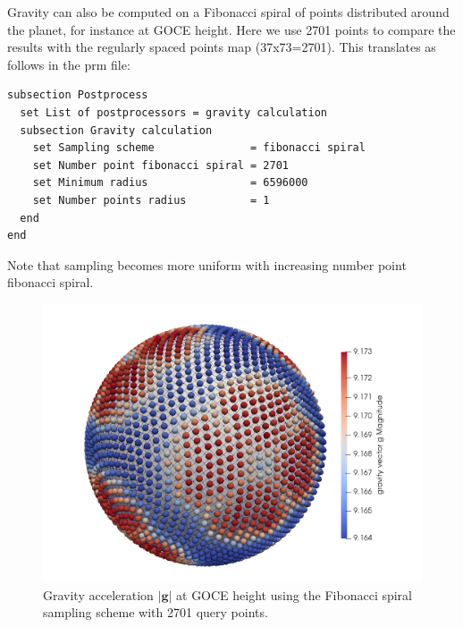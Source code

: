 Gravity can also be computed on a Fibonacci spiral of points distributed around the planet, for instance at GOCE height. Here we use 2701 points to compare the results with the regularly spaced points map (37x73=2701). This translates as follows in the prm file:

\begin{lstlisting}
subsection Postprocess
  set List of postprocessors = gravity calculation
  subsection Gravity calculation
    set Sampling scheme               = fibonacci spiral
    set Number point fibonacci spiral = 2701
    set Minimum radius                = 6596000 
    set Number points radius          = 1
  end
end
\end{lstlisting}

Note that sampling becomes more uniform with increasing number point fibonacci spiral.

\begin{figure}[h!]
\centering
\includegraphics[scale=.4]{../../benchmarks/gravity_prem/doc/spiral_prem.png}
\caption{Gravity acceleration $|{\mathbf g}|$ at GOCE height using the Fibonacci spiral sampling scheme with 2701 query points.}
\label{fig:gravitypremspirals}
\end{figure}

